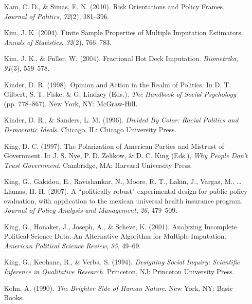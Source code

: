 \documentclass[12pt,econ]{sources/authesis}
\begin{document}
\leavevmode\hypertarget{ref-kam_risk_2010}{}%
Kam, C. D., \& Simas, E. N. (2010). Risk Orientations and Policy Frames. \emph{Journal of Politics}, \emph{72}(2), 381--396.

\leavevmode\hypertarget{ref-kim_2004_finite}{}%
Kim, J. K. (2004). Finite Sample Properties of Multiple Imputation Estimators. \emph{Annals of Statistics}, \emph{32}(2), 766--783.

\leavevmode\hypertarget{ref-kim_2004_fractional}{}%
Kim, J. K., \& Fuller, W. (2004). Fractional Hot Deck Imputation. \emph{Biometrika}, \emph{91}(3), 559--578.

\leavevmode\hypertarget{ref-kinder_1998_opinion}{}%
Kinder, D. R. (1998). Opinion and Action in the Realm of Politics. In D. T. Gilbert, S. T. Fiske, \& G. Lindzey (Eds.), \emph{The Handbook of Social Psychology} (pp. 778--867). New York, NY: McGraw-Hill.

\leavevmode\hypertarget{ref-kinder_1996_divided}{}%
Kinder, D. R., \& Sanders, L. M. (1996). \emph{Divided By Color: Racial Politics and Democratic Ideals}. Chicago, IL: Chicago University Press.

\leavevmode\hypertarget{ref-king_polarization_1997}{}%
King, D. C. (1997). The Polarization of American Parties and Mistrust of Government. In J. S. Nye, P. D. Zelikow, \& D. C. King (Eds.), \emph{Why People Don't Trust Government}. Cambridge, MA: Harvard University Press.

\leavevmode\hypertarget{ref-king_a-politically_2007}{}%
King, G., Gakidou, E., Ravishankar, N., Moore, R. T., Lakin, J., Vargas, M., \ldots{} Llamas, H. H. (2007). A ``politically robust" experimental design for public policy evaluation, with application to the mexican universal health insurance program. \emph{Journal of Policy Analysis and Management}, \emph{26}, 479--509.

\leavevmode\hypertarget{ref-king_2001_analyzing}{}%
King, G., Honaker, J., Joseph, A., \& Scheve, K. (2001). Analyzing Incomplete Political Science Data: An Alternative Algorithm for Multiple Imputation. \emph{American Political Science Review}, \emph{95}, 49--69.

\leavevmode\hypertarget{ref-king_designing_1994}{}%
King, G., Keohane, R., \& Verba, S. (1994). \emph{Designing Social Inquiry: Scientific Inference in Qualitative Research}. Princeton, NJ: Princeton University Press.

\leavevmode\hypertarget{ref-kohn_brighter_1990}{}%
Kohn, A. (1990). \emph{The Brighter Side of Human Nature}. New York, NY: Basic Books.
\end{document}
